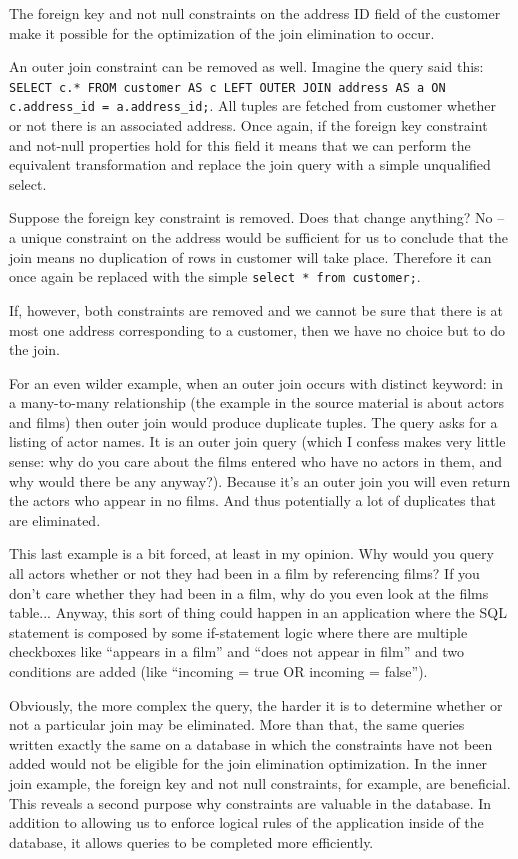 \documentclass[a4paper]{report}
\begin{document}
The foreign key and not null constraints on the address ID field of the customer make it possible for the optimization of the join elimination to occur.

An outer join constraint can be removed as well. Imagine the query said this: \texttt{SELECT c.* FROM customer AS c LEFT OUTER JOIN address AS a ON c.address\_id = a.address\_id;}. All tuples are fetched from customer whether or not there is an associated address. Once again, if the foreign key constraint and not-null properties hold for this field it means that we can perform the equivalent transformation and replace the join query with a simple unqualified select. 

Suppose the foreign key constraint is removed. Does that change anything? No -- a unique constraint on the address would be sufficient for us to conclude that the join means no duplication of rows in customer will take place. Therefore it can once again be replaced with the simple \texttt{select * from customer;}.

If, however, both constraints are removed and we cannot be sure that there is at most one address corresponding to a customer, then we have no choice but to do the join.

For an even wilder example, when an outer join occurs with distinct keyword: in a many-to-many relationship (the example in the source material is about actors and films) then outer join would produce duplicate tuples. The query asks for a listing of actor names. It is an outer join query (which I confess makes very little sense: why do you care about the films entered who have no actors in them, and why would there be any anyway?). Because it's an outer join you will even return the actors who appear in no films. And thus potentially a lot of duplicates that are eliminated. 

This last example is a bit forced, at least in my opinion. Why would you query all actors whether or not they had been in a film by referencing films? If you don't care whether they had been in a film, why do you even look at the films table... Anyway, this sort of thing could happen in an application where the SQL statement is composed by some if-statement logic where there are multiple checkboxes like ``appears in a film'' and ``does not appear in film'' and two conditions are added (like ``incoming = true OR incoming = false'').

Obviously, the more complex the query, the harder it is to determine whether or not a particular join may be eliminated. More than that, the same queries written exactly the same on a database in which the constraints have not been added would not be eligible for the join elimination optimization. In the inner join example, the foreign key and not null constraints, for example, are beneficial. This reveals a second purpose why constraints are valuable in the database. In addition to allowing us to enforce logical rules of the application inside of the database, it allows queries to be completed more efficiently.
\end{document}
